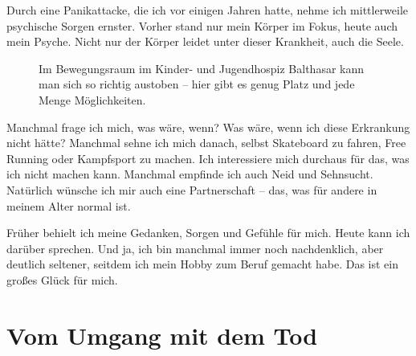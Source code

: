 \documentclass[fontsize=14pt,a4paper,headinclude,DIV=calc,automark]{scrbook}
\begin{document}
Durch eine Panikattacke, die ich vor einigen Jahren hatte, nehme ich mittlerweile psychische Sorgen ernster. Vorher stand nur mein Körper im Fokus, heute auch mein Psyche. Nicht nur der Körper leidet unter dieser Krankheit, auch die Seele.

\setlength{\fboxsep}{0pt}    %
\setlength{\fboxrule}{0.2pt} %
\begin{figure}[H]
    \centering
    \caption{Im Bewegungsraum im Kinder- und Jugendhospiz Balthasar kann man sich so richtig austoben – hier gibt es genug Platz und jede Menge Möglichkeiten.}
    \label{fig:bewegungsraum}
\end{figure}

Manchmal frage ich mich, was wäre, wenn? Was wäre, wenn ich diese Erkrankung nicht hätte? Manchmal sehne ich mich danach, selbst Skateboard zu fahren, Free Running oder Kampfsport zu machen. Ich interessiere mich durchaus für das, was ich nicht machen kann. Manchmal empfinde ich auch Neid und Sehnsucht. Natürlich wünsche ich mir auch eine Partnerschaft – das, was für andere in meinem Alter normal ist.

Früher behielt ich meine Gedanken, Sorgen und Gefühle für mich. Heute kann ich darüber sprechen. Und ja, ich bin manchmal immer noch nachdenklich, aber deutlich seltener, seitdem ich mein Hobby zum Beruf gemacht habe. Das ist ein großes Glück für mich.

\section{Vom Umgang mit dem Tod}
\end{document}
